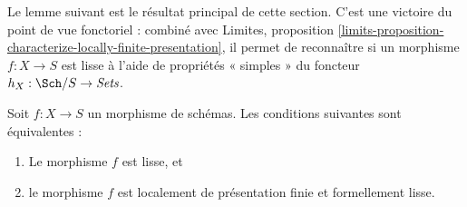 \noindent
Le lemme suivant est le résultat principal de cette section. C'est une victoire du
point de vue fonctoriel : combiné avec
Limites,
proposition \ref{limits-proposition-characterize-locally-finite-presentation},
il permet de reconnaître si un morphisme $f : X \to S$ est lisse à l'aide de
propriétés « simples » du foncteur $h_X : \Sch/S \to \textit{Sets}$.

\begin{lemma}
\label{lemma-smooth-formally-smooth}
Soit $f : X \to S$ un morphisme de schémas.
Les conditions suivantes sont équivalentes :
\begin{enumerate}
\item Le morphisme $f$ est lisse, et
\item le morphisme $f$ est localement de présentation finie et
formellement lisse.
\end{enumerate}
\end{lemma}

